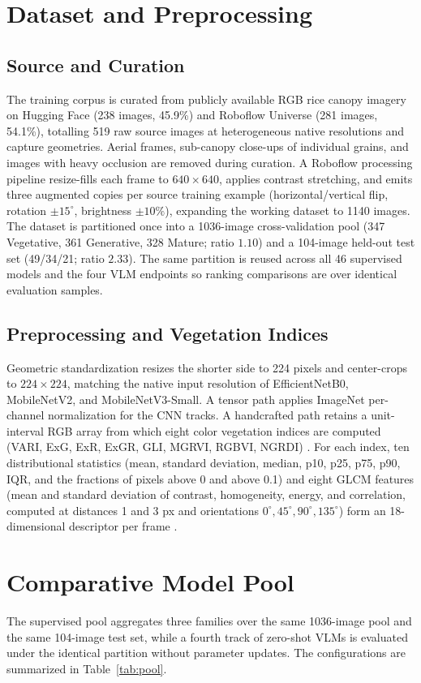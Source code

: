 \documentclass[conference]{IEEEtran}
\begin{document}
\section{Dataset and Preprocessing}
\subsection{Source and Curation}
The training corpus is curated from publicly available RGB rice canopy imagery on Hugging Face (238 images, 45.9\%) and Roboflow Universe (281 images, 54.1\%), totalling 519 raw source images at heterogeneous native resolutions and capture geometries. Aerial frames, sub-canopy close-ups of individual grains, and images with heavy occlusion are removed during curation. A Roboflow processing pipeline resize-fills each frame to $640\times640$, applies contrast stretching, and emits three augmented copies per source training example (horizontal/vertical flip, rotation $\pm15^{\circ}$, brightness $\pm10\%$), expanding the working dataset to 1140 images. The dataset is partitioned once into a 1036-image cross-validation pool (347 Vegetative, 361 Generative, 328 Mature; ratio $1.10$) and a 104-image held-out test set (49/34/21; ratio $2.33$). The same partition is reused across all 46 supervised models and the four VLM endpoints so ranking comparisons are over identical evaluation samples.

\subsection{Preprocessing and Vegetation Indices}
Geometric standardization resizes the shorter side to 224 pixels and center-crops to $224\times224$, matching the native input resolution of EfficientNetB0, MobileNetV2, and MobileNetV3-Small. A tensor path applies ImageNet per-channel normalization for the CNN tracks. A handcrafted path retains a unit-interval RGB array from which eight color vegetation indices are computed (VARI, ExG, ExR, ExGR, GLI, MGRVI, RGBVI, NGRDI) \cite{b_ma}. For each index, ten distributional statistics (mean, standard deviation, median, p10, p25, p75, p90, IQR, and the fractions of pixels above 0 and above 0.1) and eight GLCM features (mean and standard deviation of contrast, homogeneity, energy, and correlation, computed at distances 1 and 3 px and orientations $0^{\circ}, 45^{\circ}, 90^{\circ}, 135^{\circ}$) form an 18-dimensional descriptor per frame \cite{b_liu,b_iqbal}.

\section{Comparative Model Pool}
The supervised pool aggregates three families over the same 1036-image pool and the same 104-image test set, while a fourth track of zero-shot VLMs is evaluated under the identical partition without parameter updates. The configurations are summarized in Table~\ref{tab:pool}.
\end{document}
